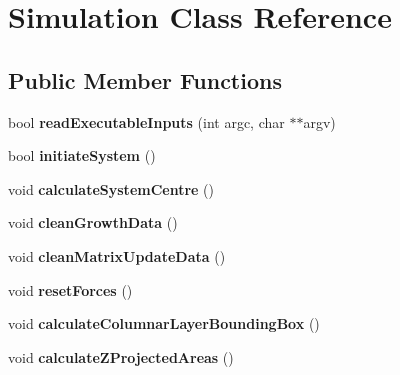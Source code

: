 \hypertarget{classSimulation}{}\section{Simulation Class Reference}
\label{classSimulation}
\subsection*{Public Member Functions}
\begin{DoxyCompactItemize}
\item 
\hypertarget{classSimulation_aa5c031b9d4c6b3d74f636adec0b695ed}{}bool {\bfseries read\+Executable\+Inputs} (int argc, char $\ast$$\ast$argv)\label{classSimulation_aa5c031b9d4c6b3d74f636adec0b695ed}

\item 
\hypertarget{classSimulation_ae44910ca27d6ec5eaa48f7136fad87ea}{}bool {\bfseries initiate\+System} ()\label{classSimulation_ae44910ca27d6ec5eaa48f7136fad87ea}

\item 
\hypertarget{classSimulation_a1f9bf054812136067d30e79345f877de}{}void {\bfseries calculate\+System\+Centre} ()\label{classSimulation_a1f9bf054812136067d30e79345f877de}

\item 
\hypertarget{classSimulation_a1c1260ec044af04ef52c517b2675e0dc}{}void {\bfseries clean\+Growth\+Data} ()\label{classSimulation_a1c1260ec044af04ef52c517b2675e0dc}

\item 
\hypertarget{classSimulation_aa8fb138f6057956ce2b6e02fbcb0254f}{}void {\bfseries clean\+Matrix\+Update\+Data} ()\label{classSimulation_aa8fb138f6057956ce2b6e02fbcb0254f}

\item 
\hypertarget{classSimulation_accaeb0b305b4d779ea3551a810caf99c}{}void {\bfseries reset\+Forces} ()\label{classSimulation_accaeb0b305b4d779ea3551a810caf99c}

\item 
\hypertarget{classSimulation_a7e8ad0106fac230f8c825431b94f61f4}{}void {\bfseries calculate\+Columnar\+Layer\+Bounding\+Box} ()\label{classSimulation_a7e8ad0106fac230f8c825431b94f61f4}

\item 
\hypertarget{classSimulation_af21c5c157e6f487f879bdd7043288982}{}void {\bfseries calculate\+Z\+Projected\+Areas} ()\label{classSimulation_af21c5c157e6f487f879bdd7043288982}


\end{DoxyCompactItemize}
